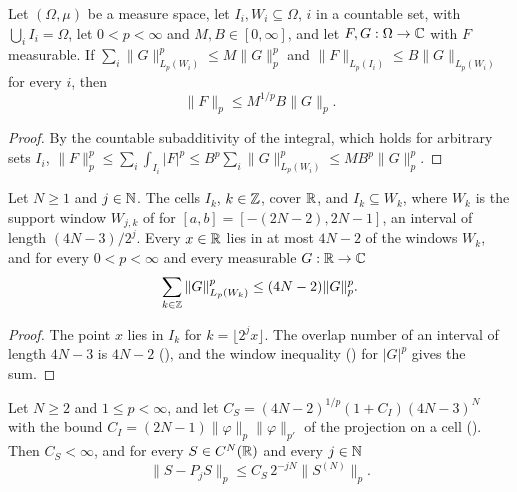 \begin{lemma}
\label{lem:daub-summing-cover}
\leanok
Let $(\Omega, \mu)$ be a measure space, let $I_i, W_i \subseteq \Omega$, $i$ in a countable set,
with $\bigcup_i I_i = \Omega$, let $0 < p < \infty$ and $M, B \in [0, \infty]$, and let
$F, G : \Omega \to \mathbb{C}$ with $F$ measurable. If
$\sum_i \|G\|_{L_p(W_i)}^p \leq M \|G\|_p^p$ and $\|F\|_{L_p(I_i)} \leq B \|G\|_{L_p(W_i)}$
for every $i$, then
\[
  \|F\|_p \leq M^{1/p} B \|G\|_p .
\]
\end{lemma}

\begin{proof}
\leanok
By the countable subadditivity of the integral, which holds for arbitrary sets $I_i$,
$\|F\|_p^p \leq \sum_i \int_{I_i} |F|^p \leq B^p \sum_i \|G\|_{L_p(W_i)}^p
\leq M B^p \|G\|_p^p$.
\end{proof}

\begin{lemma}
\label{lem:daub-cells-windows}
\leanok
{}
Let $N \geq 1$ and $j \in \mathbb{N}$. The cells $I_k$, $k \in \mathbb{Z}$, cover $\mathbb{R}$, and $I_k \subseteq W_k$,
where $W_k$ is the support window $W_{j,k}$ of  for
$[a, b] = [-(2N - 2), 2N - 1]$, an interval of length $(4N - 3)/2^j$. Every $x \in \mathbb{R}$ lies in at
most $4N - 2$ of the windows $W_k$, and for every $0 < p < \infty$ and every measurable
$G : \mathbb{R} \to \mathbb{C}$
\[
  \sum_{k \in \mathbb{Z}} \|G\|_{L_p(W_k)}^p \leq (4N - 2) \|G\|_p^p .
\]
\end{lemma}

\begin{proof}
\leanok
{}
The point $x$ lies in $I_k$ for $k = \lfloor 2^j x \rfloor$. The overlap number of an interval of
length $4N - 3$ is $4N - 2$ (), and the window inequality
() for $|G|^p$ gives the sum.
\end{proof}

\begin{proposition}
\label{prop:daub-jackson-smooth}
\leanok
{}
Let $N \geq 2$ and $1 \leq p < \infty$, and let
$C_S = (4N - 2)^{1/p} (1 + C_I) (4N - 3)^N$ with the bound
$C_I = (2N - 1) \|\varphi\|_p \|\varphi\|_{p'}$ of the projection on a cell
(). Then $C_S < \infty$, and for every $S \in C^N(\mathbb{R})$ and every
$j \in \mathbb{N}$
\[
  \|S - P_j S\|_p \leq C_S \, 2^{-jN} \|S^{(N)}\|_p .
\]
\end{proposition}

